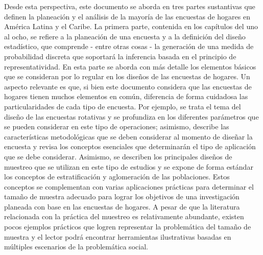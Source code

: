 \documentclass[
  12pt,
]{book}
\begin{document}
Desde esta perspectiva, este documento se aborda en tres partes sustantivas que definen la planeación y el análisis de la mayoría de las encuestas de hogares en América Latina y el Caribe. La primera parte, contenida en los capítulos del uno al ocho, se refiere a la planeación de una encuesta y a la definición del diseño estadístico, que comprende - entre otras cosas - la generación de una medida de probabilidad discreta que soportará la inferencia basada en el principio de representatividad. En esta parte se aborda con más detalle los elementos básicos que se consideran por lo regular en los diseños de las encuestas de hogares. Un aspecto relevante es que, si bien este documento considera que las encuestas de hogares tienen muchos elementos en común, diferencia de forma cuidadosa las particularidades de cada tipo de encuesta. Por ejemplo, se trata el tema del diseño de las encuestas rotativas y se profundiza en los diferentes parámetros que se pueden considerar en este tipo de operaciones; asimismo, describe las características metodológicas que se deben considerar al momento de diseñar la encuesta y revisa los conceptos esenciales que determinarán el tipo de aplicación que se debe considerar. Asimismo, se describen los principales diseños de muestreo que se utilizan en este tipo de estudios y se expone de forma estándar los conceptos de estratificación y aglomeración de las poblaciones. Estos conceptos se complementan con varias aplicaciones prácticas para determinar el tamaño de muestra adecuado para lograr los objetivos de una investigación planeada con base en las encuestas de hogares. A pesar de que la literatura relacionada con la práctica del muestreo es relativamente abundante, existen pocos ejemplos prácticos que logren representar la problemática del tamaño de muestra y el lector podrá encontrar herramientas ilustrativas basadas en múltiples escenarios de la problemática social.
\end{document}
